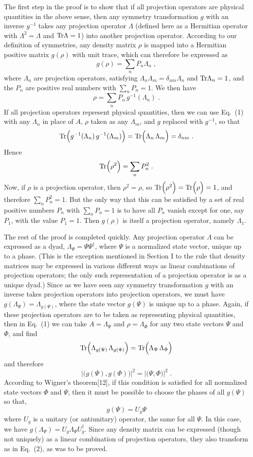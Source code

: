 The first step in the proof is to show that if all projection operators are physical quantities in the above sense, then any symmetry transformation $g$ with an inverse $g^{-1}$ takes any   projection operator $\Lambda$ (defined here as a Hermitian operator with $\Lambda^2=\Lambda$ and ${\rm Tr}\Lambda=1$)  into another projection operator.    According to our definition of symmetries,  any density matrix $\rho$ is mapped into a Hermitian positive matrix  $g(\rho)$ with unit trace, which can therefore be expressed as
$$g(\rho)=\sum_n P_n\Lambda_n\;,$$
where $\Lambda_n$ are projection operators, satisfying $\Lambda_n\Lambda_m=\delta_{nm}\Lambda_n$ and ${\rm Tr}\Lambda_n=1$, and the $P_n$ are positive real numbers with $\sum_n P_n=1$.  We then have
$$\rho=\sum_n P_n\,g^{-1}(\Lambda_n)\;.$$
If all projection operators represent physical quantities, then we can use Eq.~(1) with any $\Lambda_n$ in place of $A$, $\rho$ taken as any $\Lambda_m$, and $g$ replaced with $g^{-1}$, so that
$${\rm Tr}\Big(g^{-1}(\Lambda_n)\,g^{-1}(\Lambda_m)\Big)={\rm Tr}\Big(\Lambda_n\,\Lambda_m\Big)=\delta_{nm}\;.$$
Hence 
$${\rm Tr}\Big(\rho^2\Big)=\sum_n P_n^2\;.$$
Now, if $\rho$ is a projection operator, then $\rho^2=\rho$, so ${\rm Tr}\Big(\rho^2\Big)={\rm Tr}\Big(\rho\Big)=1$,
and therefore $\sum_n P_n^2=1$.  But the only way that this can be satisfied by a set of real positive numbers $P_n$ with $\sum_n P_n=1$ is to have all $P_n$ vanish except for one, say $P_1$, with the value $P_1=1$.  Then $g(\rho)$ is itself a projection operator, namely $\Lambda_1$.

The rest of the proof is completed quickly. Any projection operator $\Lambda$ can be expressed as a dyad, $\Lambda_\Psi=\Psi\Psi^\dagger$, where $\Psi$ is a normalized state vector, unique up to a phase.  (This is the exception mentioned in Section I to the rule that density   matrices may be expressed in various different ways as linear combinations  of projection operators; the only such representation of a projection operator is as a unique dyad.)  Since as we have seen any symmetry transformation $g$ with an inverse takes projection operators into projection operators, we must have $g(\Lambda_\Psi)=\Lambda_{g(\Psi)}$, where the state vector $g(\Psi)$ is unique up to a phase.  Again, if these projection operators are to be taken as representing physical quantities, then in Eq.~(1) we can take $A=\Lambda_\Psi$ and $\rho=\Lambda_\Phi$ for any two state vectors $\Psi$ and $\Phi$, and find 
$${\rm Tr}\Big(\Lambda_{g(\Psi)}\,\Lambda_{g(\Phi)}\Big)={\rm Tr}\Big(\Lambda_\Psi\,\Lambda_\Phi\Big)$$
 and therefore
$$\left|\Big(g(\Psi),g(\Phi)\Big)\right|^2=\left|\Big(\Psi,\Phi\Big)\right|^2\;.$$
According to Wigner's theorem[12], if this condition is satisfied for all normalized state vectors $\Phi$ and $\Psi$, then it must be possible to choose the phases of all $g(\Psi)$  so that,
$$ g(\Psi)=U_g\Psi$$
where $U_g$ is a unitary (or antiunitary) operator, the same for all $\Psi$.  In this case, we have $g(\Lambda_\Psi)=U_g \Lambda_\Psi U_g^\dagger$.  Since any density matrix can be expressed (though not uniquely) as a linear combination of projection operators, they also transform as in Eq.~(2), as was to be proved.


